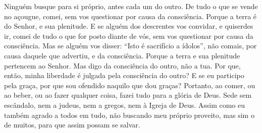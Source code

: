 {Ninguém busque para si próprio, antes cada um
{} do outro.
De tudo o que se vende no açougue, comei, sem vos questionar por causa da consciência.
Porque a terra é do Senhor, e
{} sua plenitude.
E se alguém dos descrentes vos convidar, e quiserdes ir, comei de tudo o que for posto diante de vós, sem vos questionar por causa da consciência.
Mas se alguém vos disser: “Isto é sacrifício a ídolos”, não comais, por causa daquele que
{} advertiu, e
{} da consciência. Porque a terra e sua plenitude pertencem ao Senhor.
Mas digo da consciência do outro, não a tua. Por que, então, minha liberdade é julgada pela consciência do outro?
E se eu participo
{} pela graça, por que sou ofendido naquilo que dou graças?
Portanto, ao comer, ou ao beber, ou ao fazer qualquer coisa, fazei tudo para a glória de Deus.
Sede sem escândalo, nem a judeus, nem a gregos, nem à Igreja de Deus.
Assim como eu também agrado a todos em tudo, não buscando meu próprio proveito, mas sim o de muitos, para que assim possam se salvar.

}
